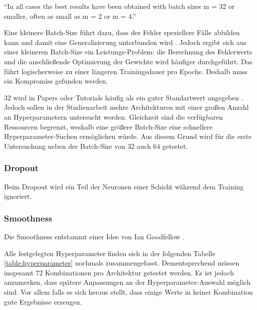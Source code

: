 \begin{center}
	\enquote{In all cases the best results have been obtained with batch sizes m = 32 or smaller, often as small as m = 2 or m = 4.}\cite[S. 16, Z. 5-7]{small-batch-size}
\end{center}

Eine kleinere Batch-Size führt dazu, dass der Fehler speziellere Fälle abbilden kann und damit eine Generalisierung unterbunden wird \cite{tutorial:tune-batch-size-machinelearningmastery}.
Jedoch ergibt sich aus einer kleineren Batch-Size ein Leistungs-Problem: die Berechnung des Fehlerwerts und die anschließende Optimierung der Gewichte wird häufiger durchgeführt.
Das führt logischerweise zu einer längeren Trainingsdauer pro Epoche.
Deshalb muss ein Kompromiss gefunden werden.
\newline

\(32\) wird in Papers oder Tutorials häufig als ein guter Standartwert angegeben \cite{default-batch-size}.
Jedoch sollen in der Studienarbeit mehre Architekturen mit einer großen Anzahl an Hyperparametern untersucht werden.
Gleichzeit sind die verfügbaren Ressourcen begrenzt, weshalb eine größere Batch-Size eine schnellere Hyperparameter-Suchen ermöglichen würde.
Aus diesem Grund wird für die erste Untersuchung neben der Batch-Size von \(32\) auch \(64\) getestet.

\subsubsection{Dropout}
Beim Dropout wird ein Teil der Neuronen einer Schicht während dem Training ignoriert.


\subsubsection{Smoothness}
Die Smoothness entstammt einer Idee von Ian Goodfellow \cite{ian-goodfellow-onesided-label-smoothing}.
\newline

Alle festgelegten Hyperparameter finden sich in der folgenden Tabelle \ref{table:hyperparameter} nochmals zusammengefasst.
Dementsprechend müssen insgesamt 72 Kombinationen pro Architektur getestet werden. 
Es ist jedoch anzumerken, dass spätere Anpassungen an der Hyperparameter-Auswahl möglich sind.
Vor allem falls es sich heraus stellt, dass einige Werte in keiner Kombination gute Ergebnisse erzeugen.

